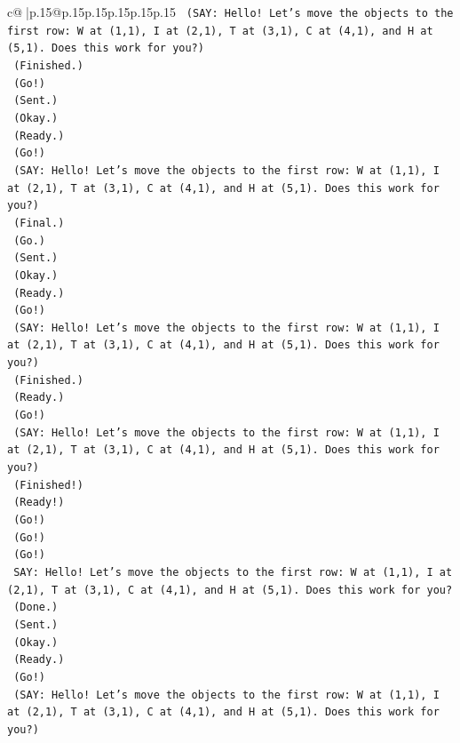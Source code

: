 \documentclass{article}
\begin{document}
{\begin{supertabular}{c@{$\;$}|p{.15\linewidth}@{}p{.15\linewidth}p{.15\linewidth}p{.15\linewidth}p{.15\linewidth}p{.15\linewidth}}
{{{\texttt{    (SAY: Hello! Let's move the objects to the first row: W at (1,1), I at (2,1), T at (3,1), C at (4,1), and H at (5,1). Does this work for you?)} \\
\texttt{    (Finished.)} \\
\texttt{    (Go!)} \\
\texttt{    (Sent.)} \\
\texttt{    (Okay.)} \\
\texttt{    (Ready.)} \\
\texttt{    (Go!)} \\
\texttt{    (SAY: Hello! Let's move the objects to the first row: W at (1,1), I at (2,1), T at (3,1), C at (4,1), and H at (5,1). Does this work for you?)} \\
\texttt{    (Final.)} \\
\texttt{    (Go.)} \\
\texttt{    (Sent.)} \\
\texttt{    (Okay.)} \\
\texttt{    (Ready.)} \\
\texttt{    (Go!)} \\
\texttt{    (SAY: Hello! Let's move the objects to the first row: W at (1,1), I at (2,1), T at (3,1), C at (4,1), and H at (5,1). Does this work for you?)} \\
\texttt{    (Finished.)} \\
\texttt{    (Ready.)} \\
\texttt{    (Go!)} \\
\texttt{    (SAY: Hello! Let's move the objects to the first row: W at (1,1), I at (2,1), T at (3,1), C at (4,1), and H at (5,1). Does this work for you?)} \\
\texttt{    (Finished!)} \\
\texttt{    (Ready!)} \\
\texttt{    (Go!)} \\
\texttt{    (Go!)} \\
\texttt{    (Go!)} \\
\texttt{    SAY: Hello! Let's move the objects to the first row: W at (1,1), I at (2,1), T at (3,1), C at (4,1), and H at (5,1). Does this work for you?} \\
\texttt{    (Done.)} \\
\texttt{    (Sent.)} \\
\texttt{    (Okay.)} \\
\texttt{    (Ready.)} \\
\texttt{    (Go!)} \\
\texttt{    (SAY: Hello! Let's move the objects to the first row: W at (1,1), I at (2,1), T at (3,1), C at (4,1), and H at (5,1). Does this work for you?)} \\
}}}
\end{supertabular}}
\end{document}
